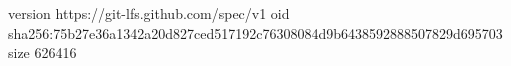 version https://git-lfs.github.com/spec/v1
oid sha256:75b27e36a1342a20d827ced517192c76308084d9b6438592888507829d695703
size 626416
